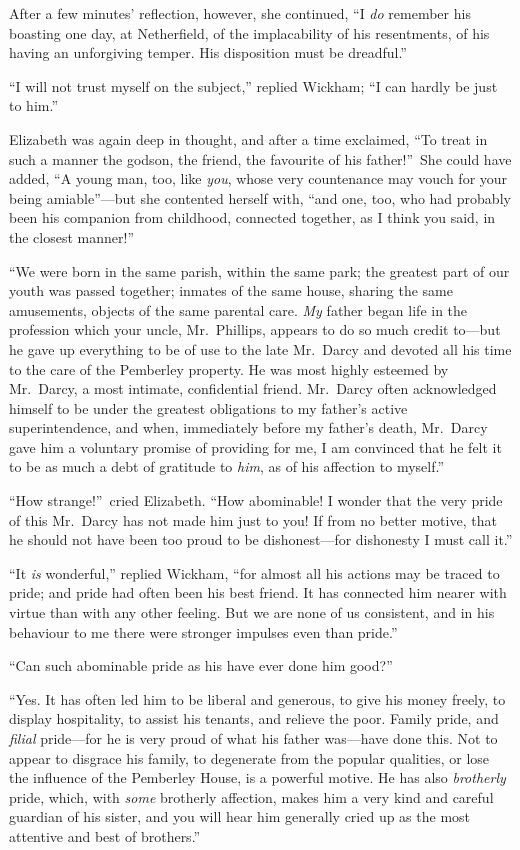 \documentclass[12pt,english]{book}
\begin{document}
After a few minutes' reflection, however, she continued, {}``I \textit{do}
remember his boasting one day, at Netherfield, of the implacability
of his resentments, of his having an unforgiving temper. His disposition
must be dreadful.''

{}``I will not trust myself on the subject,'' replied Wickham; {}``I
can hardly be just to him.''

Elizabeth was again deep in thought, and after a time exclaimed, {}``To
treat in such a manner the godson, the friend, the favourite of his
father!''\ She could have added, {}``A young man, too, like \textit{you},
whose very countenance may vouch for your being amiable''---but she
contented herself with, {}``and one, too, who had probably been his
companion from childhood, connected together, as I think you said,
in the closest manner!''

{}``We were born in the same parish, within the same park; the greatest
part of our youth was passed together; inmates of the same house,
sharing the same amusements, objects of the same parental care. \textit{My}
father began life in the profession which your uncle, Mr.\ Phillips,
appears to do so much credit to\mbox{---}but he gave up everything
to be of use to the late Mr.\ Darcy and devoted all his time to the
care of the Pemberley property. He was most highly esteemed by Mr.\ Darcy,
a most intimate, confidential friend. Mr.\ Darcy often acknowledged
himself to be under the greatest obligations to my father's active
superintendence, and when, immediately before my father's death, Mr.\ Darcy
gave him a voluntary promise of providing for me, I am convinced that
he felt it to be as much a debt of gratitude to \textit{him}, as of
his affection to myself.''

{}``How strange!''\ cried Elizabeth. {}``How abominable! I wonder
that the very pride of this Mr.\ Darcy has not made him just to you!
If from no better motive, that he should not have been too proud to
be dishonest\mbox{---}for dishonesty I must call it.''

{}``It \textit{is} wonderful,'' replied Wickham, {}``for almost
all his actions may be traced to pride; and pride had often been his
best friend. It has connected him nearer with virtue than with any
other feeling. But we are none of us consistent, and in his behaviour
to me there were stronger impulses even than pride.''

{}``Can such abominable pride as his have ever done him good?''\ 

{}``Yes. It has often led him to be liberal and generous, to give
his money freely, to display hospitality, to assist his tenants, and
relieve the poor. Family pride, and \textit{filial} pride\mbox{---}for
he is very proud of what his father was\mbox{---}have done this.
Not to appear to disgrace his family, to degenerate from the popular
qualities, or lose the influence of the Pemberley House, is a powerful
motive. He has also \textit{brotherly} pride, which, with \textit{some}
brotherly affection, makes him a very kind and careful guardian of
his sister, and you will hear him generally cried up as the most attentive
and best of brothers.''
\end{document}

